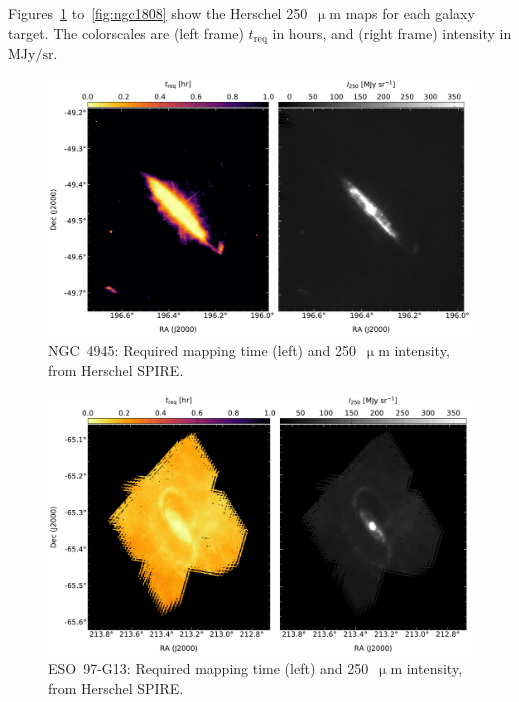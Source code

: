 Figures~\ref{fig:ngc4945} to~\ref{fig:ngc1808} show the Herschel 250~$\upmu$m maps for each galaxy target. The colorscales are (left frame) $t_{\mathrm{req}}$ in hours, and (right frame) intensity in $\mathrm{MJy/sr}$.

\begin{figure}[!htbp]
\centering
\includegraphics[width=\textwidth]{figures/galaxies/ngc4945}
\caption[NGC 4945 required mapping time.]{NGC~4945: Required mapping time (left) and 250~$\upmu$m intensity, from Herschel SPIRE.}
\label{fig:ngc4945}
\end{figure}

\begin{figure}[!htbp]
\centering
\includegraphics[width=\textwidth]{figures/galaxies/eso9713}
\caption[ESO 97-G13 required mapping time.]{ESO~97-G13: Required mapping time (left) and 250~$\upmu$m intensity, from Herschel SPIRE.}
\label{fig:eso9713}
\end{figure}

